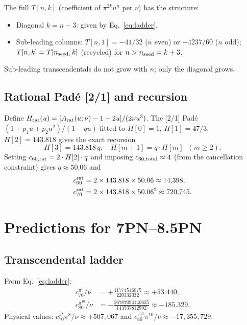 \documentclass[twocolumn,aps,prd,showpacs,superscriptaddress,floatfix]{revtex4-2}
\begin{document}
The full $T[n,k]$ (coefficient of $\pi^{2k}u^n$ per $\nu$) has the structure:
\begin{itemize}
\item Diagonal $k=n-3$: given by Eq.~\eqref{eq:ladder}.
\item Sub-leading columns: $T[n,1]=-41/32$ ($n$ even) or $-4237/60$ ($n$ odd);
      $T[n,k]=T[n_{\rm seed},k]$ (recycled) for $n>n_{\rm seed}=k+3$.
\end{itemize}
Sub-leading transcendentals do not grow with $n$; only the diagonal grows.

\subsection{Rational Pad\'e [2/1] and recursion}
\label{sec:rat}

Define $H_{\rm rat}(u)=[A_{\rm rat}(u;\nu)-1+2u]/(2\nu u^3)$.
The [2/1] Pad\'e $(1+p_1u+p_2u^2)/(1-qu)$ fitted to
$H[0]=1$, $H[1]=47/3$, $H[2]=143.818$ gives the exact recursion
\begin{equation}
  H[3]=143.818\,q, \quad H[m+1]=q\cdot H[m]\;\;(m\ge2).
  \label{eq:hrec}
\end{equation}
Setting $c_{60,\rm rat}=2\cdot H[2]\cdot q$ and imposing
$c_{60,\rm total}\approx4$ (from the cancellation constraint) gives
$q\approx50.06$ and
\begin{align}
  c_{60}^{\rm rat} &= 2\times143.818\times50.06 \approx 14{,}398,
  \label{eq:c60rat}\\
  c_{70}^{\rm rat} &= 2\times143.818\times50.06^2 \approx 720{,}745.
  \label{eq:c70rat}
\end{align}

\section{Predictions for 7PN--8.5PN}
\label{sec:pred}

\subsection{Transcendental ladder}

From Eq.~\eqref{eq:ladder}:
\begin{align}
  c_{70}^{\pi^8}/\nu
  &= +\frac{11774546875}{220332032}\approx+53.440,\\
  c_{80}^{\pi^{10}}/\nu
  &= -\frac{26787094140625}{144537812992}\approx-185.329.
\end{align}
Physical values: $c_{70}^{\pi^8}\pi^8/\nu\approx+507{,}067$ and
$c_{80}^{\pi^{10}}\pi^{10}/\nu\approx-17{,}355{,}729$.
\end{document}
